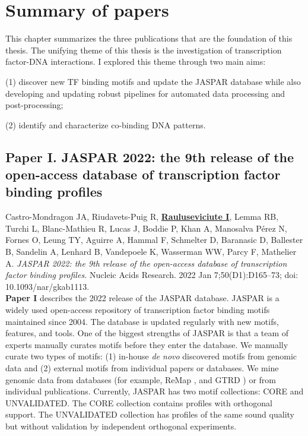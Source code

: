 \chapter{Summary of papers}

This chapter summarizes the three publications that are the foundation of this thesis. The unifying theme of this thesis is the investigation of transcription factor-DNA interactions. I explored this theme through two main aims:

    (1) discover new TF binding motifs and update the JASPAR database while also developing and updating robust pipelines for automated data processing and post-processing;

    (2) identify and characterize co-binding DNA patterns.

\section{Paper I. JASPAR 2022: the 9th release of the open-access database of transcription factor binding profiles}

Castro-Mondragon JA\footnotemark[1], Riudavets-Puig R\footnotemark[1], \textbf{\underline{Rauluseviciute I}}\footnotemark[1], Lemma RB, Turchi L, Blanc-Mathieu R, Lucas J, Boddie P, Khan A, Manosalva Pérez N, Fornes O, Leung TY, Aguirre A, Hammal F, Schmelter D, Baranasic D, Ballester B, Sandelin A, Lenhard B, Vandepoele K, Wasserman WW, Parcy F, Mathelier A. \textit{JASPAR 2022: the 9th release of the open-access database of transcription factor binding profiles.} Nucleic Acids Research. 2022 Jan 7;50(D1):D165--73; doi: 10.1093/nar/gkab1113.
\\


\textbf{Paper I} describes the 2022 release of the JASPAR database. JASPAR is a widely used open-access repository of transcription factor binding motifs maintained since 2004. The database is updated regularly with new motifs, features, and tools. One of the biggest strengths of JASPAR is that a team of experts manually curates motifs before they enter the database. We manually curate two types of motifs: (1) in-house \textit{de novo} discovered motifs from genomic data and (2) external motifs from individual papers or databases. We mine genomic data from databases (for example, ReMap \cite{hammal2022remap}, and GTRD \cite{kolmykov2021gtrd}) or from individual publications. Currently, JASPAR has two motif collections: CORE and UNVALIDATED. The CORE collection contains profiles with orthogonal support. The UNVALIDATED collection has profiles of the same sound quality but without validation by independent orthogonal experiments.

